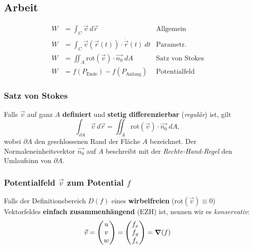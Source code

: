 \subsection{Arbeit}
    \vspace{-0.5em}
    \begin{align*}
        W &= \int_C \vec{v} \ d \vec{r} &\textrm{Allgemein}\\
        W &= \int_C \vec{v} (\vec{r}(t)) \cdot \dot{\vec{r}}(t) \ dt &\textrm{Parametr.}\\
        W &= \iint_{A} \textrm{rot}(\vec{v}) \cdot \vec{n_0} \ dA & \textrm{Satz von Stokes}\\
        W &= f\left(P_{\textrm{Ende}}\right) - f\left(P_{\textrm{Anfang}}\right) &\textrm{Potentialfeld}
    \end{align*}

    \subsubsection{Satz von Stokes} \label{sec:SatzVonStokes}
        Falls $\vec{v}$ auf ganz $A$ \textbf{definiert} und \textbf{stetig differenzierbar} (\textit{regulär}) ist, gilt
        $$
            \int_{\partial A} \vec{v} \ d \vec{r} = \iint_{A} \text{rot}(\vec{v}) \cdot \vec{n_0} \ dA,
        $$
        wobei $\partial A$ den geschlossenen Rand der Fläche $A$ bezeichnet.
        Der Normaleneinheitsvektor $\vec{n_0}$ auf $A$ beschreibt mit der \textit{Rechte-Hand-Regel} den Umlaufsinn von $\partial A$.

    \subsubsection{Potentialfeld $\vec{v}$ zum Potential $f$ \label{sec:Potentialfeld}}
        Falls der Definitionsbereich $D(f)$ eines \textbf{wirbel\-freien} ($\text{rot}(\vec{v}) \equiv 0$) Vektorfeldes \textbf{einfach zusammenhängend} (EZH) ist, nennen wir es \textit{konservativ}:
        $$ 
        \vec{v} = 
        \begin{pmatrix}
            u\\v\\w
        \end{pmatrix}
        =
        \begin{pmatrix}
            f_x\\f_y\\f_z
        \end{pmatrix}
        = \grad(f)
        $$ 

